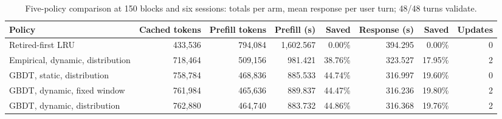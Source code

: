 \begin{table}[t]
\centering\small
\caption{Five-policy comparison at 150 blocks and six sessions: totals per arm, mean response per user turn; 48/48 turns validate.}
\label{tab:continuous-e2e}
\setlength{\tabcolsep}{4pt}
\begin{tabular}{@{}lrrrrrrr@{}}
\toprule
Policy & Cached tokens & Prefill tokens & Prefill (s) & Saved & Response (s) & Saved & Updates \\
\midrule
Retired-first LRU & 433,536 & 794,084 & 1,602.567 & 0.00\% & 394.295 & 0.00\% & 0 \\
Empirical, dynamic, distribution & 718,464 & 509,156 & 981.421 & 38.76\% & 323.527 & 17.95\% & 2 \\
GBDT, static, distribution & 758,784 & 468,836 & 885.533 & 44.74\% & 316.997 & 19.60\% & 0 \\
GBDT, dynamic, fixed window & 761,984 & 465,636 & 889.837 & 44.47\% & 316.236 & 19.80\% & 2 \\
GBDT, dynamic, distribution & 762,880 & 464,740 & 883.732 & 44.86\% & 316.368 & 19.76\% & 2 \\
\bottomrule
\end{tabular}
\end{table}
